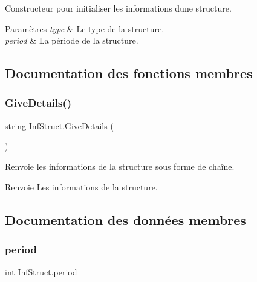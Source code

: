 Constructeur pour initialiser les informations d\textquotesingle{}une structure. 


\begin{DoxyParams}{Paramètres}
{\em type} & Le type de la structure.\\
\hline
{\em period} & La période de la structure.\\
\hline
\end{DoxyParams}


\subsection{Documentation des fonctions membres}
\mbox{\label{class_inf_struct_a56a6c689c22b39d642a9e44deab28c01}} 
\subsubsection{\texorpdfstring{Give\+Details()}{GiveDetails()}}
{\footnotesize\ttfamily string Inf\+Struct.\+Give\+Details (\begin{DoxyParamCaption}{ }\end{DoxyParamCaption})\hspace{0.3cm}{\ttfamily [inline]}}



Renvoie les informations de la structure sous forme de chaîne. 

\begin{DoxyReturn}{Renvoie}
Les informations de la structure.
\end{DoxyReturn}


\subsection{Documentation des données membres}
\mbox{\label{class_inf_struct_aca18a5c2da38d672b4129d46a2250a8a}} 
\subsubsection{\texorpdfstring{period}{period}}
{\footnotesize\ttfamily int Inf\+Struct.\+period\hspace{0.3cm}{\ttfamily [private]}}



